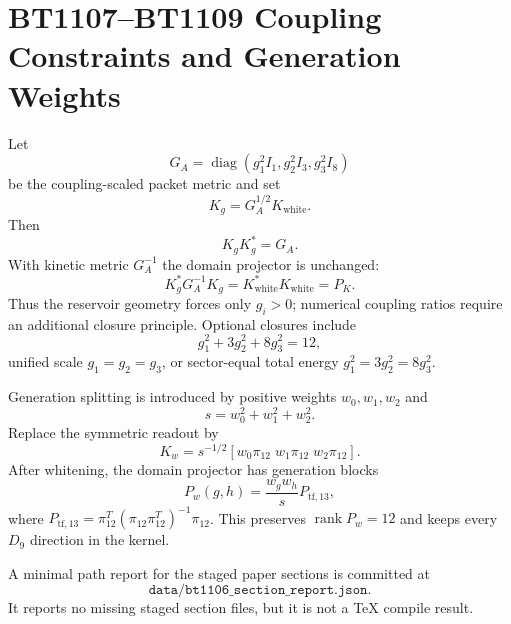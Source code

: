 \section{BT1107--BT1109 Coupling Constraints and Generation Weights}
\label{sec:bt1107-bt1109-coupling-generation-report}

Let
\[
G_A=\operatorname{diag}(g_1^2I_1,g_2^2I_3,g_3^2I_8)
\]
be the coupling-scaled packet metric and set
\[
K_g=G_A^{1/2}K_{\mathrm{white}}.
\]
Then
\[
K_gK_g^*=G_A.
\]
With kinetic metric $G_A^{-1}$ the domain projector is unchanged:
\[
K_g^*G_A^{-1}K_g=K_{\mathrm{white}}^*K_{\mathrm{white}}=P_K.
\]
Thus the reservoir geometry forces only $g_i>0$; numerical coupling ratios require an additional closure principle.  Optional closures include
\[
g_1^2+3g_2^2+8g_3^2=12,
\]
unified scale $g_1=g_2=g_3$, or sector-equal total energy $g_1^2=3g_2^2=8g_3^2$.

Generation splitting is introduced by positive weights $w_0,w_1,w_2$ and
\[
s=w_0^2+w_1^2+w_2^2.
\]
Replace the symmetric readout by
\[
K_w=s^{-1/2}[w_0\pi_{12}\; w_1\pi_{12}\; w_2\pi_{12}].
\]
After whitening, the domain projector has generation blocks
\[
P_w(g,h)=\frac{w_gw_h}{s}P_{\mathrm{tf},13},
\]
where $P_{\mathrm{tf},13}=\pi_{12}^T(\pi_{12}\pi_{12}^T)^{-1}\pi_{12}$.  This preserves $\operatorname{rank}P_w=12$ and keeps every $D_9$ direction in the kernel.

A minimal path report for the staged paper sections is committed at
\[
\texttt{data/bt1106\_section\_report.json}.
\]
It reports no missing staged section files, but it is not a TeX compile result.
